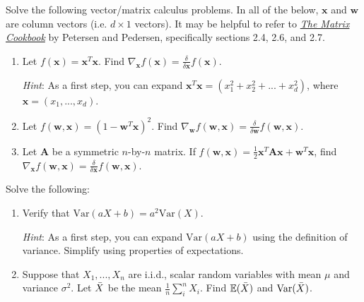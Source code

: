 \documentclass{harvardml}
\theoremstyle{definition}
\theoremstyle{plain}
\newcommand{\E}{\mathbb{E}}
\newcommand{\var}{\text{Var}}
\begin{document}
\begin{problem} 
		    Solve the following vector/matrix calculus problems. In all of the below, $\mathbf{x}$ and $\mathbf{w}$ are column vectors (i.e. $d \times 1$ vectors).  It may be helpful to refer to \href{https://www.math.uwaterloo.ca/~hwolkowi/matrixcookbook.pdf}{\emph{The Matrix Cookbook}} by Petersen and Pedersen, specifically sections 2.4, 2.6, and 2.7.
		    
		    \begin{enumerate} [label=(\alph*)]
		        \item Let $f(\mathbf{x}) = \mathbf{x}^T \mathbf{x}$. Find $\nabla_{\mathbf{x}} f(\mathbf{x}) = \frac{\delta}{\delta \mathbf{x}} f(\mathbf{x})$.
		        
		        \emph{Hint}: As a first step, you can expand $\mathbf{x}^T \mathbf{x} = (x_1^2 + x_2^2 + ... + x_d^2)$, where $\mathbf{x} = (x_1, ..., x_d)$. 
		        
		        \item Let $f(\mathbf{w},\mathbf{x}) = (1 - \mathbf{w}^T \mathbf{x})^2$. Find $\nabla_{\mathbf{w}} f(\mathbf{w},\mathbf{x}) = \frac{\delta}{\delta \mathbf{w}} f(\mathbf{w},\mathbf{x})$.
		        
		        \item Let $\mathbf{A}$ be a symmetric $n$-by-$n$ matrix. If $f(\mathbf{w},\mathbf{x}) = \frac{1}{2}\mathbf{x}^T \mathbf{A} \mathbf{x} + \mathbf{w}^T \mathbf{x}$, find $\nabla_{\mathbf{x}} f(\mathbf{w},\mathbf{x}) = \frac{\delta}{\delta \mathbf{x}} f(\mathbf{w},\mathbf{x})$.
		        \end{enumerate}
		\end{problem}

\begin{problem} Solve the following: 
\begin{enumerate} [label=(\alph*)] 
\item Verify that $\var(aX + b) = a^2\var(X)$.

\emph{Hint}: As a first step, you can expand $\var(aX + b)$ using the definition of variance.  Simplify using properties of expectations.
\item Suppose that $X_1, ..., X_n$ are i.i.d., scalar random variables with mean $\mu$ and variance $\sigma^2$. Let $\Bar{X}$ be the mean $\frac{1}{n}\sum_i^n X_i$. Find $\E(\Bar{X})$ and $\var(\Bar{X})$.
\end{enumerate}
\end{problem}
		
\end{document}
